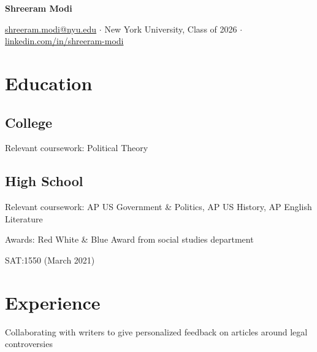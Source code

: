 \documentclass[letterpaper]{resume-shreeram}
\begin{document}
\begin{center}
  {\Huge \bfseries Shreeram Modi}

  \href{mailto:shreeram.modi@nyu.edu}{shreeram.modi@nyu.edu}
  $\cdot$
  New York University, Class of 2026
  $\cdot$
  \href{https://linkedin.com/in/shreeram-modi}{linkedin.com/in/shreeram-modi}
\end{center}

\section{Education}

\subsection{College}

\begin{compactitem}
  \item Relevant coursework: Political Theory
\end{compactitem}

\subsection{High School}

\begin{compactitem}
  \item Relevant coursework: AP US Government \& Politics, AP US
    History, AP English Literature

  \item Awards: Red White \& Blue Award from social studies department

  \item SAT:\@  1550 (March 2021)
\end{compactitem}

\section{Experience}

\begin{compactitem}
  \item Collaborating with writers to give personalized feedback on
    articles around legal controversies
\end{compactitem}
\end{document}
